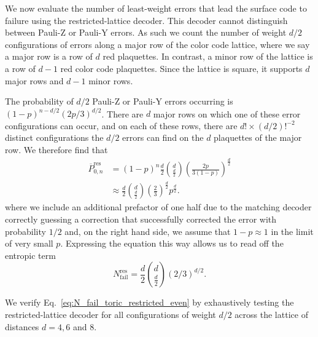 \documentclass[a4paper,twocolumn,11pt,accepted=2024-12-23]{quantumarticle}
\begin{document}
We now evaluate the number of least-weight errors that lead the surface code to failure using the restricted-lattice decoder. This decoder cannot distinguish between Pauli-Z or Pauli-Y errors. As such we count the number of weight $d/2$ configurations of errors along a major row of the color code lattice, where we say a major row is a row of $d$ red plaquettes. In contrast, a minor row of the lattice is a row of $d-1$ red color code plaquettes. Since the lattice is square, it supports $d$ major rows and $d-1$ minor rows. 

The probability of $d/2$ Pauli-Z or Pauli-Y errors occurring is $(1-p)^{n - d/2} (2p/3)^{d/2}$. There are $d$ major rows on which one of these error configurations can occur, and on each of these rows, there are $d! \times (d/2 )!^{-2} $ distinct configurations the $d/2$ errors can find on the $d$ plaquettes of the major row. We therefore find that 
\begin{align}
     \overline{P}^{\textrm{res}}_{0,n} &= (1-p)^n  \frac{d}{2}  \binom{d}{\frac{d}{2}} \left(\frac{2p }{3 (1-p)}\right)^{\frac{d}{2}} \\ &\approx  \frac{d}{2}  \binom{d}{\frac{d}{2}} \left(\frac{2}{3}\right)^{ \frac{d}{2}} p ^{\frac{d}{2}}  .
\end{align}
where we include an additional prefactor of one half due to the matching decoder correctly guessing a correction that successfully corrected the error with probability $1/2$ and, on the right hand side, we assume that $1-p \approx 1$ in the limit of very small $p$. Expressing the equation this way allows us to read off the entropic term
\begin{equation}
    N^{\textrm{res}}_{\textrm{fail}} = \frac{d}{2} \binom{d}{\frac{d}{2}} (2/3)^{d/2}.
    \label{eq:N_fail_toric_restricted_even}
\end{equation}

 We verify Eq.~\ref{eq:N_fail_toric_restricted_even} by exhaustively testing the restricted-lattice decoder for all configurations of weight $d/2$ across the lattice of distances $d = 4, 6$ and $8$.
\end{document}
